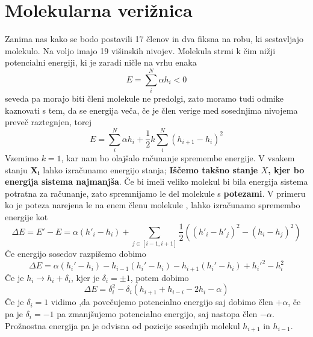 \documentclass[11pt, a4paper]{article}
\renewcommand{\vec}[1]{\mathbf{#1}}
\begin{document}
\section{Molekularna verižnica}
Zanima nas kako se bodo postavili 17 členov in dva fiksna na robu, ki sestavljajo molekulo. Na voljo imajo 19 višinskih nivojev. Molekula strmi k čim nižji potencialni energiji, ki je zaradi ničle na vrhu enaka
\begin{equation}
E = \sum_i^N \alpha h_i < 0 
\end{equation}
seveda pa morajo biti členi molekule ne predolgi, zato moramo tudi odmike kaznovati s tem, da se energija veča, če je člen verige med sosednjima nivojema preveč raztegnjen, torej
\begin{equation}
E = \sum_i^N \alpha h_i  + \frac{1}{2} k \sum_i^N (h_{i+1} - h_i)^2
\end{equation}
Vzemimo  $k = 1$, kar nam bo olajšalo računanje spremembe energije.
V vsakem stanju $\vec{X_i}$ lahko izračunamo energijo stanja; \newline\textbf{Iščemo takšno stanje $X$, kjer bo energija sistema najmanjša}. \newline\newline
Če bi imeli veliko molekul bi bila energija sistema potratna za računanje, zato spremnijamo le del molekule s \textbf{potezami}. V primeru ko je poteza narejena le na enem členu molekule , lahko izračunamo spremembo energije kot
\begin{equation} 
\Delta E = E' - E = \alpha (h'_{i} - h_{i}) + \sum_{j \in [ i -1 , i +1]} \frac{1}{2} ((h'_i - h'_j)^2 - (h_i - h_j)^2)
\end{equation}
Če energijo sosedov razpišemo dobimo
\begin{equation}
\Delta E  = \alpha(h_i' -h_i) - h_{i-1} (h_i' - h_i) - h_{i+1} (h_i' - h_i) + h_i'^2 -h_i^2
\end{equation}
Če je $h_i \rightarrow h_i + \delta_i$, kjer je $\delta_i = \pm 1$, potem dobimo
\begin{equation}
\Delta E = \delta_i^2 - \delta_i ( h_{i+1} + h_{i-i} -2 h_i - \alpha)
\end{equation}
Če je $\delta_i = 1 $ vidimo ,da povečujemo potencialno energijo saj dobimo člen $+ \alpha$, če pa je $\delta_i = -1 $ pa zmanjšujemo potencialno energijo, saj nastopa člen $-\alpha$. Prožnostna energija pa je odvisna od pozicije sosednjih molekul $h_{i+1} $ in $ h_{i-1}$.
\end{document}
